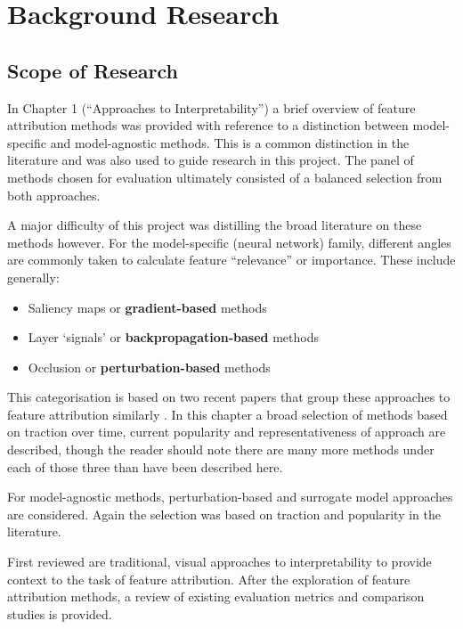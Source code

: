 \documentclass[main]{subfiles}
\begin{document}
\chapter{Background Research}

\section{Scope of Research} \label{sec:scoperesearch}

In Chapter 1 (``Approaches to Interpretability'') a brief overview of feature attribution methods was provided with reference to a distinction between model-specific and model-agnostic methods. This is a common distinction in the literature and was also used to guide research in this project. The panel of methods chosen for evaluation ultimately consisted of a balanced selection from both approaches. 

A major difficulty of this project was distilling the broad literature on these methods however. For the model-specific (neural network) family, different angles are commonly taken to calculate feature ``relevance'' or importance. These include generally:
\begin{itemize}
\item Saliency maps or \textbf{gradient-based} methods
\item Layer `signals' or \textbf{backpropagation-based} methods
\item Occlusion or \textbf{perturbation-based} methods
\end{itemize}

This categorisation is based on two recent papers that group these approaches to feature attribution similarly \cite{deeplift} \cite{patternnet}. In this chapter a broad selection of methods based on traction over time, current popularity and representativeness of approach are described, though the reader should note there are many more methods under each of those three than have been described here.

For model-agnostic methods, perturbation-based and surrogate model approaches are considered. Again the selection was based on traction and popularity in the literature.

First reviewed are traditional, visual approaches to interpretability to provide context to the task of feature attribution. After the exploration of feature attribution methods, a review of existing evaluation metrics and comparison studies is provided.
\end{document}
